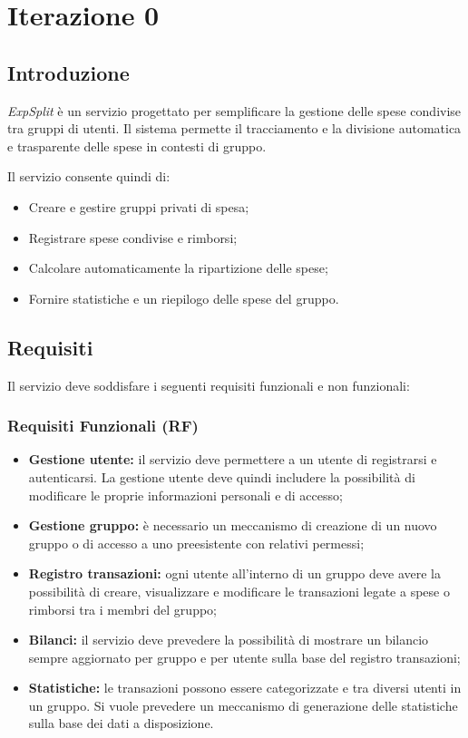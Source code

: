 \section{Iterazione 0}

\subsection{Introduzione}
\emph{ExpSplit} è un servizio progettato per semplificare la gestione delle spese condivise tra gruppi di utenti. Il sistema permette il tracciamento e la divisione automatica e trasparente delle spese in contesti di gruppo.

Il servizio consente quindi di:
\begin{itemize}
    \item Creare e gestire gruppi privati di spesa;
    \item Registrare spese condivise e rimborsi;
    \item Calcolare automaticamente la ripartizione delle spese;
    \item Fornire statistiche e un riepilogo delle spese del gruppo.
\end{itemize}

\subsection{Requisiti}
Il servizio deve soddisfare i seguenti requisiti funzionali e non funzionali:

\subsubsection{Requisiti Funzionali (RF)}
\begin{itemize}
    \item \textbf{Gestione utente:} il servizio deve permettere a un utente di registrarsi e autenticarsi. La gestione utente deve quindi includere la possibilità di modificare le proprie informazioni personali e di accesso;
    \item \textbf{Gestione gruppo:} è necessario un meccanismo di creazione di un nuovo gruppo o di accesso a uno preesistente con relativi permessi;
    \item \textbf{Registro transazioni:} ogni utente all'interno di un gruppo deve avere la possibilità di creare, visualizzare e modificare le transazioni legate a spese o rimborsi tra i membri del gruppo;
    \item \textbf{Bilanci:} il servizio deve prevedere la possibilità di mostrare un bilancio sempre aggiornato per gruppo e per utente sulla base del registro transazioni;
    \item \textbf{Statistiche:} le transazioni possono essere categorizzate e tra diversi utenti in un gruppo. Si vuole prevedere un meccanismo di generazione delle statistiche sulla base dei dati a disposizione.
\end{itemize}

